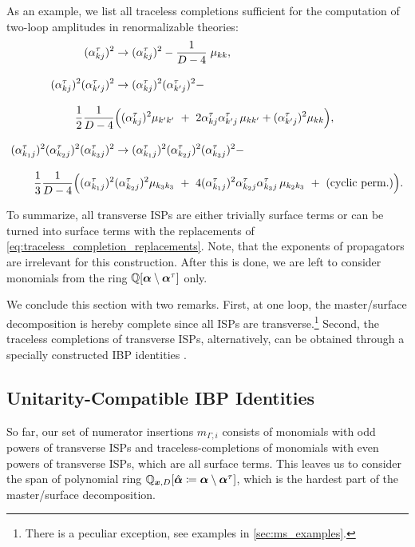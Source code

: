 As an example, we list all traceless completions sufficient for the computation of two-loop amplitudes in renormalizable theories:
\begin{equation}
  \label{eq:traceless_completion_replacements}
  \addtolength{\jot}{2ex}
  \begin{aligned}
    (\alpha_{kj}^{\tau})^2 &\to (\alpha_{kj}^{\tau})^2 - \frac{1}{D-4}\;\mu_{kk}, \\
    (\alpha_{kj}^{\tau})^2(\alpha_{k^\prime j}^{\tau})^2 &\to (\alpha_{kj}^{\tau})^2(\alpha_{k^\prime j}^{\tau})^2 - \\
    \frac{1}{2} \frac{1}{D-4} &
    \qty\Big(
    (\alpha_{kj}^{\tau})^2 \mu_{k^\prime k^\prime} ~+~ 2 \alpha_{kj}^{\tau}\alpha_{k^\prime j}^{\tau} \, \mu_{k k^\prime} + (\alpha_{k^\prime j}^{\tau})^2 \mu_{k k}
    ), \\ 
    (\alpha_{k_1j}^{\tau})^2(\alpha_{k_2 j}^{\tau})^2 (\alpha_{k_3 j}^{\tau})^2&\to (\alpha_{k_1j}^{\tau})^2(\alpha_{k_2 j}^{\tau})^2 (\alpha_{k_3 j}^{\tau})^2 - \\ 
    \frac{1}{3}\frac{1}{D-4} 
    \Big(
    (\alpha_{k_1j}^{\tau})^2 &(\alpha_{k_2j}^{\tau})^2 \mu_{k_3 k_3} ~+~ 4 (\alpha_{k_1j}^{\tau})^2 \alpha_{k_2j}^{\tau} \alpha_{k_3j}^{\tau}\,\mu_{k_2 k_3} ~+~(\text{cyclic perm.})
    \Big).
  \end{aligned}
\end{equation}

To summarize, all transverse ISPs are either trivially surface terms or can be turned into surface terms with the replacements of \cref{eq:traceless_completion_replacements}.
Note, that the exponents of propagators are irrelevant for this construction.
After this is done, we are left to consider monomials from the ring $\mathbb{Q}[\vb*{\alpha}\setminus\vb*{\alpha}^\tau]$ only.


We conclude this section with two remarks.
First, at one loop, the master/surface decomposition is hereby complete since all ISPs are transverse.\footnote{%
  There is a peculiar exception, see examples in \cref{sec:ms_examples}.
}
Second, the traceless completions of transverse ISPs, alternatively,
can be obtained through a specially constructed IBP identities \cite{Ita:2015tya}.



\subsection{Unitarity-Compatible IBP Identities}
\label{sec:unitarity_compatible_ibps}
So far, our set of numerator insertions $m_{\Gamma,i}$ consists of monomials with odd powers of transverse ISPs and traceless-completions of
monomials with even powers of transverse ISPs, which are all surface terms.
This leaves us to consider the span of polynomial ring $\mathbb{Q}_{\vb*{x},D}[\hat{\vb*{\alpha}}\coloneqq \vb*{\alpha}\setminus\vb*{\alpha}^\tau]$,
which is the hardest part of the master/surface decomposition.

